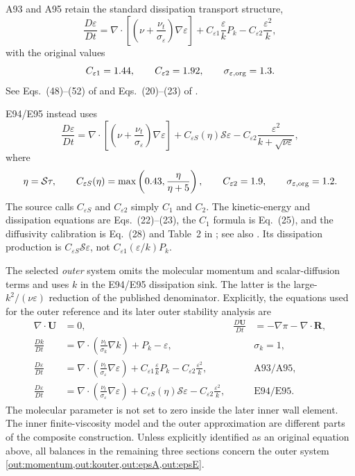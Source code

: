 \documentclass[11pt,a4paper]{article}
\numberwithin{equation}{section}
\newcommand{\eps}{\varepsilon}
\newcommand{\nut}{\nu_t}
\newcommand{\R}{\boldsymbol R}
\begin{document}
A93 and A95 retain the standard dissipation transport structure,
\begin{equation}
 \frac{D\eps}{Dt}=
 \nabla\cdot\left[\left(\nu+\frac{\nut}{\sigma_\eps}\right)
                   \nabla\eps\right]
 +C_{\eps1}\frac{\eps}{k}P_k-C_{\eps2}\frac{\eps^2}{k},
 \label{out:originalepsA}
\end{equation}
with the original values
\begin{equation}
 C_{\eps1}=1.44,\qquad C_{\eps2}=1.92,\qquad
 \sigma_{\eps,\rm org}=1.3.
 \label{out:originalAconstants}
\end{equation}
See Eqs.~(48)--(52) of \citet{Shih1993} and Eqs.~(20)--(23) of
\citet{Shih1995ASM}.

E94/E95 instead uses
\begin{equation}
 \frac{D\eps}{Dt}=
 \nabla\cdot\left[\left(\nu+\frac{\nut}{\sigma_\eps}\right)
                   \nabla\eps\right]
 +C_{\eps S}(\eta)\mathcal S\eps
 -C_{\eps2}\frac{\eps^2}{k+\sqrt{\nu\eps}},
 \label{out:originalepsE}
\end{equation}
where
\begin{equation}
 \eta=\mathcal S\tau,\qquad
 C_{\eps S}(\eta)=\max\left(0.43,\frac{\eta}{\eta+5}\right),
 \qquad C_{\eps2}=1.9,\qquad \sigma_{\eps,\rm org}=1.2.
 \label{out:originalEconstants}
\end{equation}
The source calls $C_{\eps S}$ and $C_{\eps2}$ simply $C_1$ and $C_2$.
The kinetic-energy and dissipation equations are Eqs.~(22)--(23),
the $C_1$ formula is Eq.~(25), and the diffusivity calibration is
Eq.~(28) and Table~2 in \citet{Shih1995EVM}; see also
\citet{Shih1994EVM}. Its dissipation production is
$C_{\eps S}\mathcal S\eps$, not
$C_{\eps1}(\eps/k)P_k$.

The selected \emph{outer} system omits the molecular momentum and
scalar-diffusion terms and uses $k$ in the E94/E95 dissipation
sink. The latter is the large-$k^2/(\nu\eps)$ reduction of the
published denominator. Explicitly, the equations used for the outer
reference and its later outer stability analysis are
\begin{align}
 \nabla\cdot\boldsymbol U&=0,
 &\frac{D\boldsymbol U}{Dt}&=-\nabla\pi-\nabla\cdot\R,
 \label{out:momentum}\\
 \frac{Dk}{Dt}&=\nabla\cdot\left(\frac{\nut}{\sigma_k}\nabla k\right)
                  +P_k-\eps,
 &&\sigma_k=1, \label{out:kouter}\\
 \frac{D\eps}{Dt}&=\nabla\cdot\left(\frac{\nut}{\sigma_\eps}\nabla\eps\right)
       +C_{\eps1}\frac{\eps}{k}P_k-C_{\eps2}\frac{\eps^2}{k},
 &&\text{A93/A95}, \label{out:epsA}\\
 \frac{D\eps}{Dt}&=\nabla\cdot\left(\frac{\nut}{\sigma_\eps}\nabla\eps\right)
       +C_{\eps S}(\eta)\mathcal S\eps-C_{\eps2}\frac{\eps^2}{k},
 &&\text{E94/E95}. \label{out:epsE}
\end{align}
The molecular parameter is not set to zero inside the later inner wall
element. The inner finite-viscosity model and the outer approximation
are different parts of the composite construction. Unless explicitly
identified as an original equation above, all balances in the remaining
three sections concern the outer system \cref{out:momentum,out:kouter,out:epsA,out:epsE}.
\end{document}
